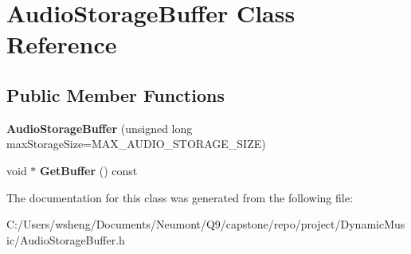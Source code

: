 \hypertarget{class_audio_storage_buffer}{}\section{Audio\+Storage\+Buffer Class Reference}
\label{class_audio_storage_buffer}
\subsection*{Public Member Functions}
\begin{DoxyCompactItemize}
\item 
\mbox{\label{class_audio_storage_buffer_a2cf5386cef8f624432ae376322a76a5c}} 
{\bfseries Audio\+Storage\+Buffer} (unsigned long max\+Storage\+Size=M\+A\+X\+\_\+\+A\+U\+D\+I\+O\+\_\+\+S\+T\+O\+R\+A\+G\+E\+\_\+\+S\+I\+ZE)
\item 
\mbox{\label{class_audio_storage_buffer_a3f492db802456b6dabdc1c491b76c247}} 
void $\ast$ {\bfseries Get\+Buffer} () const
\end{DoxyCompactItemize}


The documentation for this class was generated from the following file\+:\begin{DoxyCompactItemize}
\item 
C\+:/\+Users/wsheng/\+Documents/\+Neumont/\+Q9/capstone/repo/project/\+Dynamic\+Music/Audio\+Storage\+Buffer.\+h\end{DoxyCompactItemize}
